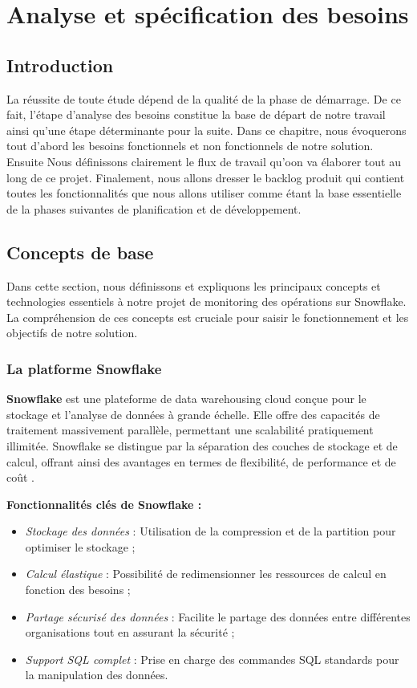 \chapter{Analyse et spécification des besoins}

\section*{Introduction}
    \par {\huge L}a réussite de toute étude dépend de la qualité de la phase de démarrage. 
    De ce fait, l'étape d'analyse des besoins constitue la base de départ de notre travail 
    ainsi qu'une étape déterminante pour la suite. 
    Dans ce chapitre, nous évoquerons tout d'abord les besoins fonctionnels et non
    fonctionnels de notre solution. Ensuite Nous définissons clairement le flux de travail 
    qu'oon va élaborer tout au long de ce projet. Finalement, nous allons dresser le backlog produit qui contient toutes les fonctionnalités que nous
    allons utiliser comme étant la base essentielle de la phases suivantes de planification et de développement.
    \section{Concepts de base}

    Dans cette section, nous définissons et expliquons les principaux concepts et technologies essentiels à notre projet de monitoring des opérations sur Snowflake. La compréhension de ces concepts est cruciale pour saisir le fonctionnement et les objectifs de notre solution.
    
    \subsection{La platforme Snowflake }
    
    \textbf{Snowflake} est une plateforme de data warehousing cloud conçue pour le stockage et l'analyse de données à grande échelle.
    Elle offre des capacités de traitement massivement parallèle, permettant une scalabilité pratiquement illimitée. 
    Snowflake se distingue par la séparation des couches de stockage et de calcul, offrant ainsi des avantages en termes de flexibilité, de performance et de coût \cite{snowflake}.
    
    \textbf{Fonctionnalités clés de Snowflake :}
    \begin{itemize}
        \item \textit{Stockage des données} : Utilisation de la compression et de la partition pour optimiser le stockage ;
        \item \textit{Calcul élastique} : Possibilité de redimensionner les ressources de calcul en fonction des besoins ;
        \item \textit{Partage sécurisé des données} : Facilite le partage des données entre différentes organisations tout en assurant la sécurité ;
        \item \textit{Support SQL complet} : Prise en charge des commandes SQL standards pour la manipulation des données.
    \end{itemize}
    

